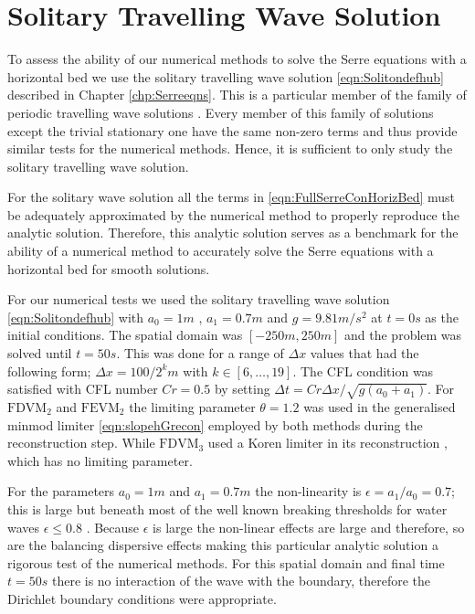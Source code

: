 \section{Solitary Travelling Wave Solution}
To assess the ability of our numerical methods to solve the Serre equations with a horizontal bed we use the solitary travelling wave solution \eqref{eqn:Solitondefhub} described in Chapter \ref{chp:Serreeqns}. This is a particular member of the family of periodic travelling wave solutions \cite{El-etal-2006}. Every member of this family of solutions except the trivial stationary one have the same non-zero terms and thus provide similar tests for the numerical methods. Hence, it is sufficient to only study the solitary travelling wave solution.

For the solitary wave solution all the terms in \eqref{eqn:FullSerreConHorizBed} must be adequately approximated by the numerical method to properly reproduce the analytic solution. Therefore, this analytic solution serves as a benchmark for the ability of a numerical method to accurately solve the Serre equations with a horizontal bed for smooth solutions.

For our numerical tests we used the solitary travelling wave solution \eqref{eqn:Solitondefhub} with $a_0 = 1m$ , $a_1 = 0.7m$ and $g= 9.81m/s^2$ at $t=0s$ as the initial conditions. The spatial domain was $[-250m,250m]$ and the problem was solved until $t= 50s$. This was done for a range of $\Delta x$ values that had the following form; $\Delta x = 100 / 2^k m$ with $k \in  \left[6,\dots,19\right]$. The CFL condition was satisfied with CFL number $Cr = 0.5$ by setting $\Delta t = Cr \Delta x / \sqrt{g\left(a_0 + a_1\right)}$. For $\text{FDVM}_2$ and $\text{FEVM}_2$ the limiting parameter $\theta  = 1.2$ was used in the generalised minmod limiter \eqref{eqn:slopehGrecon} employed by both methods during the reconstruction step. While $\text{FDVM}_3$ used a Koren limiter in its reconstruction \cite{Zoppou-etal-2017}, which has no limiting parameter. 

For the parameters $a_0 = 1m$ and $a_1 = 0.7m$ the non-linearity is $\epsilon = a_1 / a_0 = 0.7$; this is large but beneath most of the well known breaking thresholds for water waves $\epsilon \le 0.8$ \cite{Ippen-Kulin-1954-4}. Because $\epsilon$ is large the non-linear effects are large and therefore, so are the balancing dispersive effects making this particular analytic solution a rigorous test of the numerical methods. For this spatial domain and final time $t=50s$ there is no interaction of the wave with the boundary, therefore the Dirichlet boundary conditions were appropriate.

